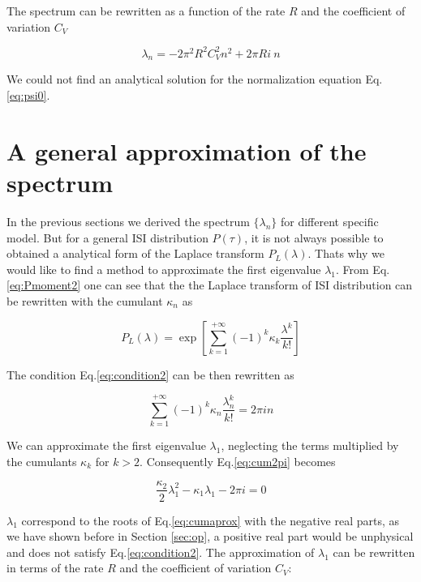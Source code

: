 \documentclass[12pt,twoside]{report}
\begin{document}
The spectrum can be rewritten as a function of the rate $R$ and the coefficient of variation $C_V$

\begin{equation}
\lambda_n=- 2\pi^2R^2C_V^2n^2+2\pi R i\:n
\end{equation}

We could not find an analytical solution for the normalization equation Eq.\ref{eq:psi0}.

\section{A general approximation of the spectrum}
\label{sec:eigv}
In the previous sections we derived the spectrum $\{\lambda_n\}$ for different specific model. But for a general ISI distribution $P(\tau)$, it is not always possible to obtained a analytical form of the Laplace transform $P_L(\lambda)$. Thats why we would like to find a method to approximate the first eigenvalue $\lambda_1$. From Eq.\eqref{eq:Pmoment2} one can see that the the Laplace transform of ISI distribution can be rewritten with the cumulant $\kappa_n$ as

\begin{equation}
\label{eq:PLcum}
P_L(\lambda)=\exp\left[ \sum_{k=1}^{+\infty}(-1)^k\kappa_k \frac{\lambda^k}{k!}\right]
\end{equation}

The condition Eq.\eqref{eq:condition2} can be then rewritten as

\begin{equation}
\label{eq:cum2pi}
\sum_{k=1}^{+\infty}(-1)^k\kappa_n \frac{\lambda_n^k}{k!}=2 \pi i n
\end{equation}

We can approximate the first eigenvalue $\lambda_1$, neglecting the terms multiplied by the cumulants $\kappa_k$ for $k>2$. Consequently Eq.\eqref{eq:cum2pi} becomes

\begin{equation}
\label{eq:cumaprox}
\frac{\kappa_2}{2}\lambda_1^2-\kappa_1\lambda_1 -2\pi i=0
\end{equation}

$\lambda_1$ correspond to the roots of Eq.\eqref{eq:cumaprox} with the negative real parts, as we have shown before in Section \ref{sec:op}, a positive real part would be unphysical and does not satisfy Eq.\eqref{eq:condition2}. The approximation of $\lambda_1$ can be rewritten in terms of the rate $R$ and the coefficient of variation $C_V$: 
\end{document}
